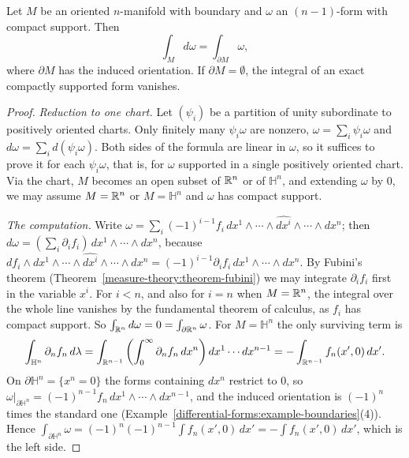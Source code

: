 \begin{theorem}[Stokes]\label{differential-forms:theorem-stokes}
Let $M$ be an oriented $n$-manifold with boundary and $\omega$ an $(n-1)$-form with compact support. Then
\[
\int_Md\omega = \int_{\partial M}\omega,
\]
where $\partial M$ has the induced orientation. If $\partial M = \emptyset$, the integral of an exact compactly supported form vanishes.
\end{theorem}

\begin{proof}
\emph{Reduction to one chart.} Let $(\psi_i)$ be a partition of unity subordinate to positively oriented charts. Only finitely many $\psi_i\omega$ are nonzero, $\omega = \sum_i\psi_i\omega$ and
$d\omega = \sum_id(\psi_i\omega)$. Both sides of the formula are linear in $\omega$, so it suffices to prove it for each $\psi_i\omega$, that is, for $\omega$ supported in a single positively oriented
chart. Via the chart, $M$ becomes an open subset of $\mathbb{R}^n$ or of $\mathbb{H}^n$, and extending $\omega$ by $0$, we may assume $M = \mathbb{R}^n$ or $M = \mathbb{H}^n$ and $\omega$ has compact support.

\emph{The computation.} Write
$\omega = \sum_i(-1)^{i-1}f_i\,dx^1 \wedge \cdots \wedge \widehat{dx^i} \wedge \cdots \wedge dx^n$; then $d\omega = (\sum_i\partial_if_i)\,dx^1 \wedge \cdots \wedge dx^n$, because
$d f_i \wedge dx^1 \wedge \cdots \wedge \widehat{dx^i} \wedge \cdots \wedge dx^n = (-1)^{i-1}\partial_if_i\,dx^1 \wedge \cdots \wedge dx^n$. By Fubini's theorem (Theorem~\ref{measure-theory:theorem-fubini})
we may integrate $\partial_if_i$ first in the variable $x^i$. For $i < n$, and also for $i = n$ when $M = \mathbb{R}^n$, the integral over the whole line vanishes by the fundamental theorem of calculus,
as $f_i$ has compact support. So $\int_{\mathbb{R}^n}d\omega = 0 = \int_{\partial\mathbb{R}^n}\omega$. For $M = \mathbb{H}^n$ the only surviving term is
\[
\int_{\mathbb{H}^n}\partial_nf_n\,d\lambda = \int_{\mathbb{R}^{n-1}}\left(\int_0^\infty\partial_nf_n\,dx^n\right)dx^1 \cdots dx^{n-1} = -\int_{\mathbb{R}^{n-1}}f_n(x', 0)\,dx' .
\]
On $\partial\mathbb{H}^n = \{x^n = 0\}$ the forms containing $dx^n$ restrict to $0$, so $\omega|_{\partial\mathbb{H}^n} = (-1)^{n-1}f_n\,dx^1 \wedge \cdots \wedge dx^{n-1}$, and the induced orientation is
$(-1)^n$ times the standard one (Example~\ref{differential-forms:example-boundaries}(4)). Hence $\int_{\partial\mathbb{H}^n}\omega = (-1)^n(-1)^{n-1}\int f_n(x', 0)\,dx' = -\int f_n(x', 0)\,dx'$,
which is the left side.
\end{proof}

